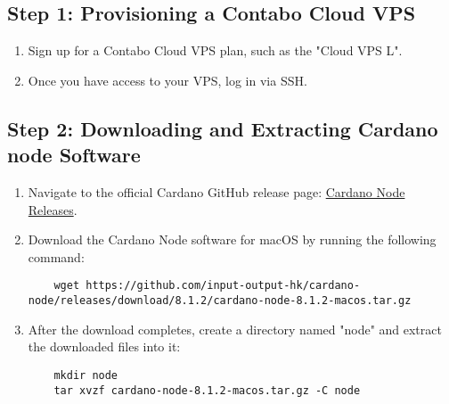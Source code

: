 \subsection{Step 1: Provisioning a Contabo Cloud VPS}
\begin{enumerate}
  \item Sign up for a Contabo Cloud VPS plan, such as the "Cloud VPS L".
  \item Once you have access to your VPS, log in via SSH.
\end{enumerate}

\subsection{Step 2: Downloading and Extracting Cardano node Software}
\begin{enumerate}
  \item Navigate to the official Cardano GitHub release page: \href{https://github.com/input-output-hk/cardano-node/releases/tag/8.1.2}{Cardano Node Releases}.
  \item Download the Cardano Node software for macOS by running the following command:
        \begin{verbatim}
    wget https://github.com/input-output-hk/cardano-node/releases/download/8.1.2/cardano-node-8.1.2-macos.tar.gz
    \end{verbatim}
  \item After the download completes, create a directory named "node" and extract the downloaded files into it:
        \begin{verbatim}
    mkdir node
    tar xvzf cardano-node-8.1.2-macos.tar.gz -C node
    \end{verbatim}
\end{enumerate}

